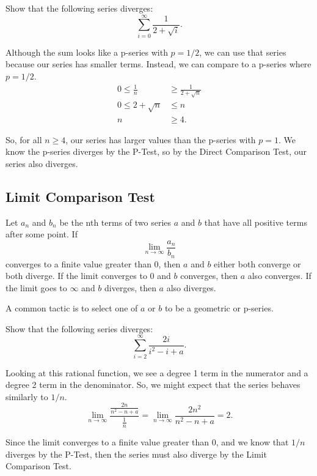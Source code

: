 \begin{example}
	Show that the following series diverges:
	\begin{equation*}
		\sum_{i=0}^{\infty}{\frac{1}{2+\sqrt{i}}}.
	\end{equation*}
\end{example}
\begin{answer}
	Although the sum looks like a p-series with $p=1/2$, we can use that series because our series has smaller terms.
	Instead, we can compare to a p-series where $p=1/2$.
	\begin{align*}
		0 \leq \frac{1}{n} &\geq \frac{1}{2+\sqrt{n}} \\
		0 \leq 2 + \sqrt{n} &\leq n \\
		n & \geq 4.
	\end{align*}
	
	So, for all $n \geq 4$, our series has larger values than the p-series with $p=1$.
	We know the p-series diverges by the P-Test, so by the Direct Comparison Test, our series also diverges.
\end{answer}

\subsection{Limit Comparison Test}
\begin{lemma}
	Let $a_n$ and $b_n$ be the nth terms of two series $a$ and $b$ that have all positive terms after some point.
	If
	\begin{equation*}
		\lim_{n\to\infty}{\frac{a_n}{b_n}}
	\end{equation*}
	converges to a finite value greater than 0, then $a$ and $b$ either both converge or both diverge.
	If the limit converges to 0 and $b$ converges, then $a$ also converges.
	If the limit goes to $\infty$ and $b$ diverges, then $a$ also diverges.
\end{lemma}

A common tactic is to select one of $a$ or $b$ to be a geometric or p-series.

\begin{example}
	Show that the following series diverges:
	\begin{equation*}
		\sum_{i=2}^{\infty}{\frac{2i}{i^2-i+a}}.
	\end{equation*}
\end{example}
\begin{answer}
	Looking at this rational function, we see a degree 1 term in the numerator and a degree 2 term in the denominator.
	So, we might expect that the series behaves similarly to $1/n$.
	\begin{equation*}
		\lim_{n\to\infty}{\frac{\frac{2n}{n^2-n+a}}{\frac{1}{n}}} = \lim_{n\to\infty}{\frac{2n^2}{n^2-n+a}} = 2.
	\end{equation*}
	
	Since the limit converges to a finite value greater than 0, and we know that $1/n$ diverges by the P-Test, then the series must also diverge by the Limit Comparison Test.
\end{answer}

